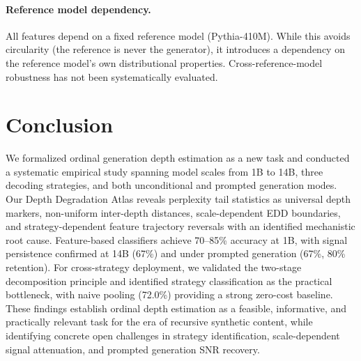 \documentclass[11pt,a4paper]{article}
\begin{document}
\paragraph{Reference model dependency.}
All features depend on a fixed reference model (Pythia-410M). While this avoids circularity (the reference is never the generator), it introduces a dependency on the reference model's own distributional properties. Cross-reference-model robustness has not been systematically evaluated.

\section{Conclusion}

We formalized ordinal generation depth estimation as a new task and conducted a systematic empirical study spanning model scales from 1B to 14B, three decoding strategies, and both unconditional and prompted generation modes. Our Depth Degradation Atlas reveals perplexity tail statistics as universal depth markers, non-uniform inter-depth distances, scale-dependent EDD boundaries, and strategy-dependent feature trajectory reversals with an identified mechanistic root cause. Feature-based classifiers achieve 70--85\% accuracy at 1B, with signal persistence confirmed at 14B (67\%) and under prompted generation (67\%, 80\% retention). For cross-strategy deployment, we validated the two-stage decomposition principle and identified strategy classification as the practical bottleneck, with naive pooling (72.0\%) providing a strong zero-cost baseline. These findings establish ordinal depth estimation as a feasible, informative, and practically relevant task for the era of recursive synthetic content, while identifying concrete open challenges in strategy identification, scale-dependent signal attenuation, and prompted generation SNR recovery.


\end{document}
